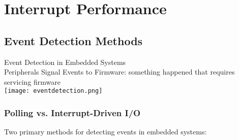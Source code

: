 \section{Interrupt Performance}

\subsection{Event Detection Methods}

\begin{concept}{Event Detection in Embedded Systems}\\
    Peripherals Signal Events to Firmware: something happened that requires servicing firmware\\
    \texttt{[image: eventdetection.png]}
\end{concept}

\subsubsection{Polling vs. Interrupt-Driven I/O}
Two primary methods for detecting events in embedded systems:


